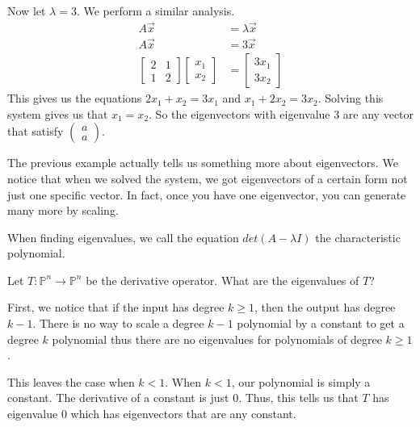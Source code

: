 \begin{example}
    Now let $\lambda=3$. We perform a similar analysis.
    \begin{align*}
        A\vec{x}&=\lambda\vec{x}\\
        A\vec{x}&=3\vec{x}\\
        \begin{bmatrix}
            2 & 1\\
            1 & 2
        \end{bmatrix}\begin{bmatrix}
            x_1 \\ x_2
        \end{bmatrix}&=\begin{bmatrix}
            3x_1 \\ 3x_2
        \end{bmatrix}
    \end{align*}
    This gives us the equations $2x_1+x_2=3x_1$ and $x_1+2x_2=3x_2$. Solving this system gives us that $x_1=x_2$. So the eigenvectors with eigenvalue $3$ are any vector that satisfy $\begin{pmatrix}
        a \\ a
    \end{pmatrix}$.
\end{example}
The previous example actually tells us something more about eigenvectors. We notice that when we solved the system, we got eigenvectors of a certain form not just one specific vector. In fact, once you have one eigenvector, you can generate many more by scaling.
\begin{definition}
    When finding eigenvalues, we call the equation $det(A-\lambda I)$ the characteristic polynomial.
\end{definition}
\begin{example}
    Let $T: \mathbb{P}^n\to\mathbb{P}^n$ be the derivative operator. What are the eigenvalues of $T$?

    First, we notice that if the input has degree $k\geq 1$, then the output has degree $k-1$. There is no way to scale a degree $k-1$ polynomial by a constant to get a degree $k$ polynomial thus there are no eigenvalues for polynomials of degree $k\geq 1$.

    This leaves the case when $k<1$. When $k<1$, our polynomial is simply a constant. The derivative of a constant is just $0$. Thus, this tells us that $T$ has eigenvalue $0$ which has eigenvectors that are any constant.
\end{example}
